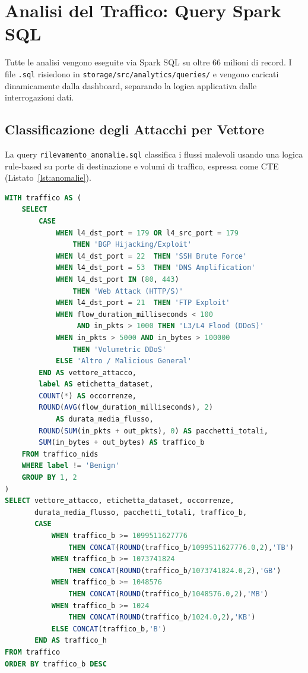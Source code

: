 \documentclass[10pt,a4paper]{article}
\begin{document}
\section{Analisi del Traffico: Query Spark SQL}

Tutte le analisi vengono eseguite via Spark SQL su oltre 66 milioni di record.
I file \texttt{.sql} risiedono in \texttt{storage/src/analytics/queries/} e
vengono caricati dinamicamente dalla dashboard, separando la logica applicativa
dalle interrogazioni dati.

\subsection{Classificazione degli Attacchi per Vettore}

La query \texttt{rilevamento\_anomalie.sql} classifica i flussi malevoli usando
una logica rule-based su porte di destinazione e volumi di traffico, espressa
come CTE (Listato~\ref{lst:anomalie}).

\begin{lstlisting}[language=SQL, caption={Classificazione rule-based dei flussi anomali}, label=lst:anomalie]
WITH traffico AS (
    SELECT
        CASE
            WHEN l4_dst_port = 179 OR l4_src_port = 179
                THEN 'BGP Hijacking/Exploit'
            WHEN l4_dst_port = 22  THEN 'SSH Brute Force'
            WHEN l4_dst_port = 53  THEN 'DNS Amplification'
            WHEN l4_dst_port IN (80, 443)
                THEN 'Web Attack (HTTP/S)'
            WHEN l4_dst_port = 21  THEN 'FTP Exploit'
            WHEN flow_duration_milliseconds < 100
                 AND in_pkts > 1000 THEN 'L3/L4 Flood (DDoS)'
            WHEN in_pkts > 5000 AND in_bytes > 100000
                THEN 'Volumetric DDoS'
            ELSE 'Altro / Malicious General'
        END AS vettore_attacco,
        label AS etichetta_dataset,
        COUNT(*) AS occorrenze,
        ROUND(AVG(flow_duration_milliseconds), 2)
            AS durata_media_flusso,
        ROUND(SUM(in_pkts + out_pkts), 0) AS pacchetti_totali,
        SUM(in_bytes + out_bytes) AS traffico_b
    FROM traffico_nids
    WHERE label != 'Benign'
    GROUP BY 1, 2
)
SELECT vettore_attacco, etichetta_dataset, occorrenze,
       durata_media_flusso, pacchetti_totali, traffico_b,
       CASE
           WHEN traffico_b >= 1099511627776
               THEN CONCAT(ROUND(traffico_b/1099511627776.0,2),'TB')
           WHEN traffico_b >= 1073741824
               THEN CONCAT(ROUND(traffico_b/1073741824.0,2),'GB')
           WHEN traffico_b >= 1048576
               THEN CONCAT(ROUND(traffico_b/1048576.0,2),'MB')
           WHEN traffico_b >= 1024
               THEN CONCAT(ROUND(traffico_b/1024.0,2),'KB')
           ELSE CONCAT(traffico_b,'B')
       END AS traffico_h
FROM traffico
ORDER BY traffico_b DESC
\end{lstlisting}
\end{document}
